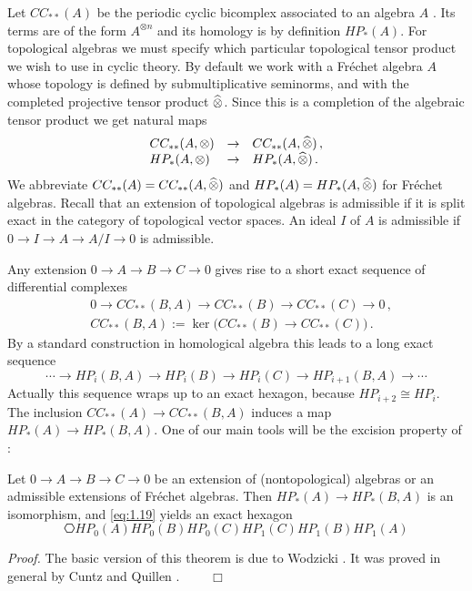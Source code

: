 Let $CC_{**}(A)$ be the periodic cyclic bicomplex associated to an algebra $A$
\cite[Section 1]{Lod}. Its terms are of the form $A^{\otimes n}$ and its homology
is by definition $HP_* (A)$.
For topological algebras we must specify which particular topological
tensor product we wish to use in cyclic theory. By default we work with a
Fr\'echet algebra $A$ whose topology is defined by
submultiplicative seminorms, and with the completed projective
tensor product $\widehat{\otimes}$. Since this is a completion of the algebraic
tensor product we get natural maps
\[
\begin{array}{lll}
CC_{**}(A , \otimes) & \to & CC_{**}(A ,\widehat{\otimes}) \,, \\
HP_* (A , \otimes) &\to & HP_* (A ,\widehat{\otimes}) \,.
\end{array}
\]
We abbreviate $CC_{**}(A) = CC_{**}(A ,\widehat{\otimes})$ and $HP_* (A) = HP_* (A ,\widehat{\otimes} )$ for Fr\'echet
algebras. Recall that an extension of topological algebras is admissible if it is split 
exact in the category of topological vector spaces. An ideal $I$ of $A$ is admissible if\\ 
$0 \to I \to A \to A/I \to 0$ is admissible. 

Any extension $0 \to A \to B \to C \to 0$ gives rise to a short exact sequence of
differential complexes
\begin{align*}
& 0 \to CC_{**}(B,A) \to CC_{**}(B) \to CC_{**}(C) \to 0 \,, \\
& CC_{**}(B,A) := \ker \big( CC_{**}(B) \to CC_{**}(C) \big) \,.
\end{align*}
By a standard construction in homological algebra this leads to a long exact sequence
\begin{equation}\label{eq:1.19}
\cdots \to HP_i (B,A) \to HP_i (B) \to HP_i (C) \to HP_{i+1}(B,A) \to \cdots
\end{equation}
Actually this sequence wraps up to an exact hexagon, because $HP_{i+2} \cong HP_i$.
The inclusion $CC_{**}(A) \to CC_{**}(B,A)$ induces a map $HP_* (A) \to HP_* (B,A)$.
One of our main tools will be the excision property of \pch \!:

\begin{thm}\label{thm:1.2}
Let $0 \to A \to B \to C \to 0$ be an extension of \textup{(}nontopological\textup{)}
algebras or an admissible extensions of Fr\'echet algebras. Then $HP_* (A) \to HP_* (B,A)$
is an isomorphism, and \eqref{eq:1.19} yields an exact hexagon
\[
\hexagon{HP_0 (A)}{HP_0 (B)}{HP_0 (C)}{HP_1 (C)}{HP_1 (B)}{HP_1 (A)}
\]
\end{thm}
\emph{Proof.}
The basic version of this theorem is due to Wodzicki \cite{Wod}.
It was proved in general by Cuntz and Quillen \cite{CuQu,Cun}.
$\qquad \Box$ \\[2mm]

